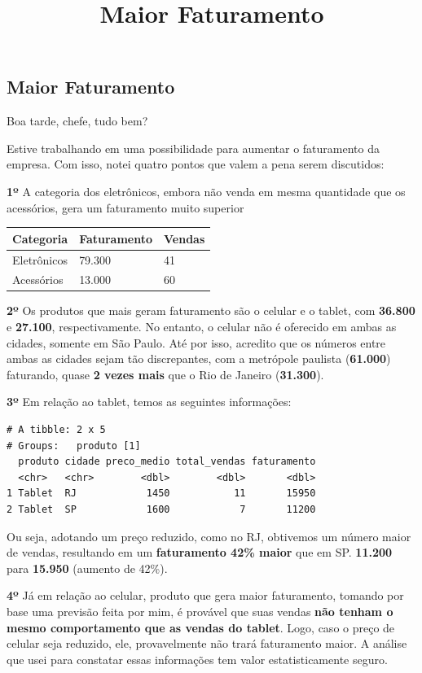 \documentclass[
  letterpaper,
  DIV=11,
  numbers=noendperiod]{scrartcl}
\title{Maior Faturamento}
\author{}
\date{}
\begin{document}
\maketitle


\subsection{Maior Faturamento}\label{maior-faturamento}

Boa tarde, chefe, tudo bem?

Estive trabalhando em uma possibilidade para aumentar o faturamento da
empresa. Com isso, notei quatro pontos que valem a pena serem
discutidos:

\textbf{1º} A categoria dos eletrônicos, embora não venda em mesma
quantidade que os acessórios, gera um faturamento muito superior

\begin{longtable}[]{@{}lll@{}}
\toprule\noalign{}
Categoria & Faturamento & Vendas \\
\midrule\noalign{}
\endhead
\bottomrule\noalign{}
\endlastfoot
Eletrônicos & 79.300 & 41 \\
Acessórios & 13.000 & 60 \\
\end{longtable}

\textbf{2º} Os produtos que mais geram faturamento são o celular e o
tablet, com \textbf{36.800} e \textbf{27.100}, respectivamente. No
entanto, o celular não é oferecido em ambas as cidades, somente em São
Paulo. Até por isso, acredito que os números entre ambas as cidades
sejam tão discrepantes, com a metrópole paulista (\textbf{61.000})
faturando, quase \textbf{2 vezes mais} que o Rio de Janeiro
(\textbf{31.300}).

\textbf{3º} Em relação ao tablet, temos as seguintes informações:

\begin{verbatim}
# A tibble: 2 x 5
# Groups:   produto [1]
  produto cidade preco_medio total_vendas faturamento
  <chr>   <chr>        <dbl>        <dbl>       <dbl>
1 Tablet  RJ            1450           11       15950
2 Tablet  SP            1600            7       11200
\end{verbatim}

Ou seja, adotando um preço reduzido, como no RJ, obtivemos um número
maior de vendas, resultando em um \textbf{faturamento 42\% maior} que em
SP. \textbf{11.200} para \textbf{15.950} (aumento de 42\%).

\textbf{4º} Já em relação ao celular, produto que gera maior
faturamento, tomando por base uma previsão feita por mim, é provável que
suas vendas \textbf{não tenham o mesmo comportamento que as vendas do
tablet}. Logo, caso o preço de celular seja reduzido, ele, provavelmente
não trará faturamento maior. A análise que usei para constatar essas
informações tem valor estatisticamente seguro.
\end{document}
